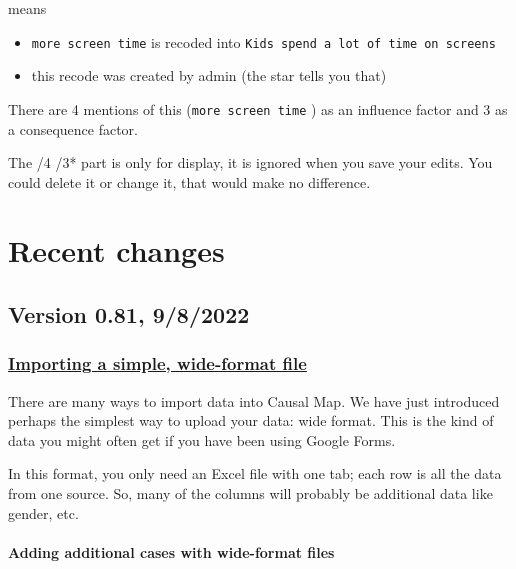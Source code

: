 \documentclass[
]{book}
\providecommand{\tightlist}{%
  \setlength{\itemsep}{0pt}\setlength{\parskip}{0pt}}
\begin{document}
means

\begin{itemize}
\tightlist
\item
  \texttt{more\ screen\ time} is recoded into \texttt{Kids\ spend\ a\ lot\ of\ time\ on\ screens}
\item
  this recode was created by admin (the star tells you that)
\end{itemize}

There are 4 mentions of this (\texttt{more\ screen\ time} ) as an influence factor and 3 as a consequence factor.

The /4 /3* part is only for display, it is ignored when you save your edits. You could delete it or change it, that would make no difference.

\hypertarget{changelog}{%
\chapter{Recent changes}\label{changelog}}

\hypertarget{version-0.81-982022}{%
\section{Version 0.81, 9/8/2022}\label{version-0.81-982022}}

\hypertarget{importing-a-simple-wide-format-file}{%
\subsection{\texorpdfstring{\protect\hyperlink{upload-summary}{Importing a simple, wide-format file}}{Importing a simple, wide-format file}}\label{importing-a-simple-wide-format-file}}

There are many ways to import data into Causal Map. We have just introduced perhaps the simplest way to upload your data: wide format. This is the kind of data you might often get if you have been using Google Forms.

In this format, you only need an Excel file with one tab; each row is all the data from one source. So, many of the columns will probably be additional data like gender, etc.

\hypertarget{adding-additional-cases-with-wide-format-files-1}{%
\subsubsection{Adding additional cases with wide-format files}\label{adding-additional-cases-with-wide-format-files-1}}
\end{document}
